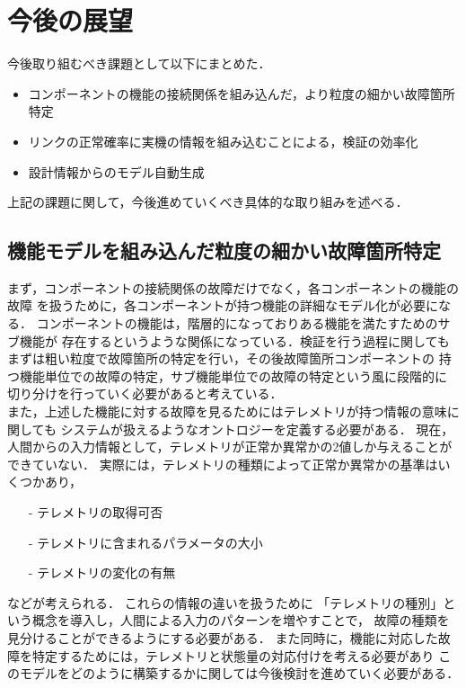\documentclass[11pt]{jsreport}
\begin{document}
  \section{今後の展望}
  今後取り組むべき課題として以下にまとめた．
\begin{itemize}
  \item コンポーネントの機能の接続関係を組み込んだ，より粒度の細かい故障箇所特定
  \item リンクの正常確率に実機の情報を組み込むことによる，検証の効率化
  \item 設計情報からのモデル自動生成
\end{itemize}
上記の課題に関して，今後進めていくべき具体的な取り組みを述べる．

\subsection{機能モデルを組み込んだ粒度の細かい故障箇所特定}
まず，コンポーネントの接続関係の故障だけでなく，各コンポーネントの機能の故障
を扱うために，各コンポーネントが持つ機能の詳細なモデル化が必要になる．
コンポーネントの機能は，階層的になっておりある機能を満たすためのサブ機能が
存在するというような関係になっている．検証を行う過程に関しても
まずは粗い粒度で故障箇所の特定を行い，その後故障箇所コンポーネントの
持つ機能単位での故障の特定，サブ機能単位での故障の特定という風に段階的に
切り分けを行っていく必要があると考えている．\\
また，上述した機能に対する故障を見るためにはテレメトリが持つ情報の意味に関しても
システムが扱えるようなオントロジーを定義する必要がある．
現在，人間からの入力情報として，テレメトリが正常か異常かの2値しか与えることができていない．
実際には，テレメトリの種類によって正常か異常かの基準はいくつかあり，
\begin{itemize}
  \item[-] テレメトリの取得可否
  \item[-] テレメトリに含まれるパラメータの大小
  \item[-] テレメトリの変化の有無
\end{itemize}
などが考えられる．
これらの情報の違いを扱うために
「テレメトリの種別」という概念を導入し，人間による入力のパターンを増やすことで，
故障の種類を見分けることができるようにする必要がある．
また同時に，機能に対応した故障を特定するためには，テレメトリと状態量の対応付けを考える必要があり
このモデルをどのように構築するかに関しては今後検討を進めていく必要がある．\\
\end{document}
